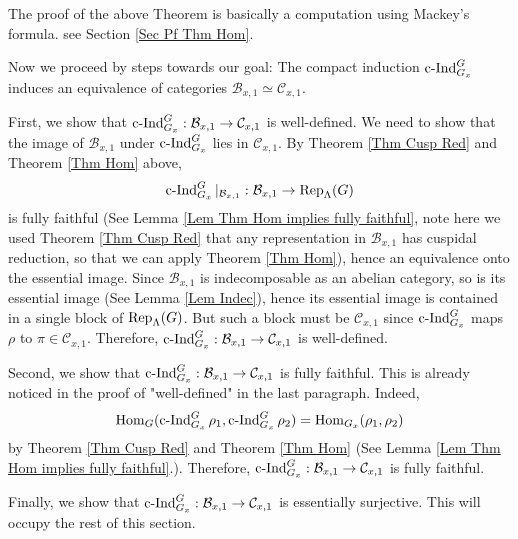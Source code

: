 	The proof of the above Theorem is basically a computation using Mackey's formula. see Section \ref{Sec Pf Thm Hom}.
	
	Now we proceed by steps towards our goal: The compact induction $\operatorname{\operatorname{c-Ind}}_{G_x}^G$ induces an equivalence of categories $\mathcal{B}_{x,1} \simeq \mathcal{C}_{x,1}$. 
	
	First, we show that $\operatorname{\operatorname{c-Ind}}_{G_x}^G: \mathcal{B}_{x,1} \to \mathcal{C}_{x,1}$ is well-defined. We need to show that the image of $\mathcal{B}_{x,1}$ under $\operatorname{\operatorname{c-Ind}}_{G_x}^G$ lies in $\mathcal{C}_{x,1}$. By Theorem \ref{Thm Cusp Red} and Theorem \ref{Thm Hom} above, $$\operatorname{\operatorname{c-Ind}}_{G_x}^G|_{\mathcal{B}_{x,1}}: \mathcal{B}_{x,1} \to \operatorname{\operatorname{Rep}}_{\Lambda}(G)$$
	is fully faithful (See Lemma \ref{Lem Thm Hom implies fully faithful}, note here we used Theorem \ref{Thm Cusp Red} that any representation in $\mathcal{B}_{x,1}$ has cuspidal reduction, so that we can apply Theorem \ref{Thm Hom}), hence an equivalence onto the essential image. Since $\mathcal{B}_{x,1}$ is indecomposable as an abelian category, so is its essential image (See Lemma \ref{Lem Indec}), hence its essential image is contained in a single block of $\operatorname{\operatorname{Rep}}_{\Lambda}(G)$. But such a block must be $\mathcal{C}_{x,1}$ since $\operatorname{\operatorname{c-Ind}}_{G_x}^G$ maps $\rho$ to $\pi \in \mathcal{C}_{x,1}$. Therefore, $\operatorname{\operatorname{c-Ind}}_{G_x}^G: \mathcal{B}_{x,1} \to \mathcal{C}_{x,1}$ is well-defined.
	
	Second, we show that $\operatorname{\operatorname{c-Ind}}_{G_x}^G: \mathcal{B}_{x,1} \to \mathcal{C}_{x,1}$ is fully faithful. This is already noticed in the proof of "well-defined" in the last paragraph. Indeed, 
	$$\operatorname{\operatorname{Hom}}_G(\operatorname{\operatorname{c-Ind}}_{G_x}^G\rho_1, \operatorname{\operatorname{c-Ind}}_{G_x}^G\rho_2)=\operatorname{\operatorname{Hom}}_{G_x}(\rho_1, \rho_2)$$
	by Theorem \ref{Thm Cusp Red} and Theorem \ref{Thm Hom} (See Lemma \ref{Lem Thm Hom implies fully faithful}.). Therefore, $\operatorname{\operatorname{c-Ind}}_{G_x}^G: \mathcal{B}_{x,1} \to \mathcal{C}_{x,1}$ is fully faithful.
	
	Finally, we show that $\operatorname{\operatorname{c-Ind}}_{G_x}^G: \mathcal{B}_{x,1} \to \mathcal{C}_{x,1}$ is essentially surjective. This will occupy the rest of this section. 
	
